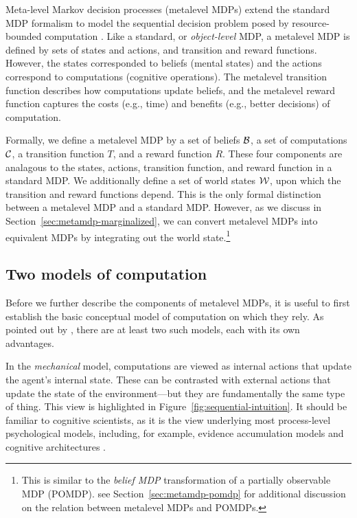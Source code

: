 
Meta-level Markov decision processes (metalevel MDPs) extend the standard MDP formalism to model the sequential decision problem posed by resource-bounded computation \citep{hay2012selecting}. Like a standard, or \emph{object-level} MDP, a metalevel MDP is defined by sets of states and actions, and transition and reward functions. However, the states corresponded to beliefs (mental states) and the actions correspond to computations (cognitive operations). The metalevel transition function describes how computations update beliefs, and the metalevel reward function captures the costs (e.g., time) and benefits (e.g., better decisions) of computation.

Formally, we define a metalevel MDP by a set of beliefs $\mathcal{B}$, a set of computations $\mathcal{C}$, a transition function $T$, and a reward function $R$. These four components are analagous to the states, actions, transition function, and reward function in a standard MDP. We additionally define a set of world states $\mathcal{W}$, upon which the transition and reward functions depend. This is the only formal distinction between a metalevel MDP and a standard MDP. However, as we discuss in Section~\ref{sec:metamdp-marginalized}, we can convert metalevel MDPs into equivalent MDPs by integrating out the world state.\footnote{This is similar to the \emph{belief MDP} transformation of a partially observable MDP (POMDP). see Section~\ref{sec:metamdp-pomdp} for additional discussion on the relation between metalevel MDPs and POMDPs.}



\subsection{Two models of computation}

Before we further describe the components of metalevel MDPs, it is useful to first establish the basic conceptual model of computation on which they rely. As pointed out by \citet[Chapter~7]{hay2016principles}, there are at least two such models, each with its own advantages.

In the \emph{mechanical} model, computations are viewed as internal actions that update the agent's internal state. These can be contrasted with external actions that update the state of the environment---but they are fundamentally the same type of thing. This view is highlighted in Figure~\ref{fig:sequential-intuition}. It should be familiar to cognitive scientists, as it is the view underlying most process-level psychological models, including, for example, evidence accumulation models and cognitive architectures .


